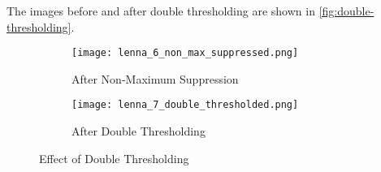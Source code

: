 The images before and after double thresholding are shown in \autoref{fig:double-thresholding}.

\begin{figure}[ht]
    \centering
    \begin{subfigure}[b]{0.4\textwidth}
        \centering
        \texttt{[image: lenna\_6\_non\_max\_suppressed.png]}
        \caption{After Non-Maximum Suppression}
    \end{subfigure}
    \hfill
    \begin{subfigure}[b]{0.4\textwidth}
        \centering
        \texttt{[image: lenna\_7\_double\_thresholded.png]}
        \caption{After Double Thresholding}
    \end{subfigure}
    \caption{Effect of Double Thresholding}
    \label{fig:double-thresholding}
\end{figure}